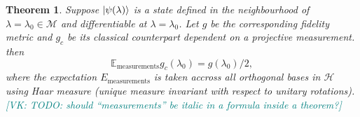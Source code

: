\documentclass[
  american,aps,pra,reprint,floatfix,nofootinbib,superscriptaddress
]{revtex4-2}
\newtheorem{theorem}{Theorem}
\newcommand{\VK}[1]{\textcolor{teal}{[VK: #1]}}
\begin{document}
\begin{theorem}
  \label{th:avggc}
  Suppose $\ket{\psi(\lambda)}$ is a state defined in the
  neighbourhood of $\lambda = \lambda_0 \in \mathcal{M}$ and differentiable at
  $\lambda=\lambda_0$. Let $g$ be the corresponding fidelity metric
  and $g_c$ be its classical counterpart dependent on a projective
  measurement. then
  \begin{equation}
    \label{eq:Emeas}
    \mathbb{E}_{\textrm{measurements}} g_c(\lambda_0) = g(\lambda_0) / 2,
  \end{equation}
where the expectation $E_{\textrm{measurements}}$ is taken accross
all orthogonal bases in $\mathcal{H}$ using Haar measure (unique measure
invariant with respect to unitary rotations).
\VK{TODO: should ``measurements'' be italic in a formula inside a theorem?}
\end{theorem}
\end{document}
